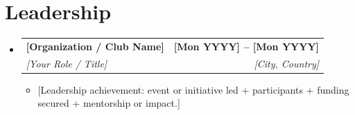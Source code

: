 \documentclass[letterpaper,11pt]{article}
\makeatletter
\newcommand{\resumeItem}[1]{
  \item\small{
    {#1 \vspace{-2pt}}
  }
}
\newcommand{\resumeSubheading}[4]{
  \vspace{-2pt}\item
    \begin{tabular*}{1.0\textwidth}[t]{l@{\extracolsep{\fill}}r}
      \textbf{#1} & \textbf{\small #2} \\
      \textit{\small#3} & \textit{\small #4} \\
    \end{tabular*}\vspace{-7pt}
}
\newcommand{\resumeSubHeadingListStart}{\begin{itemize}[leftmargin=0.0in, label={}]}
\newcommand{\resumeSubHeadingListEnd}{\end{itemize}}
\newcommand{\resumeItemListStart}{\begin{itemize}}
\newcommand{\resumeItemListEnd}{\end{itemize}\vspace{-5pt}}
\makeatother
\begin{document}
\section{Leadership}
    \resumeSubHeadingListStart
        \resumeSubheading{[Organization / Club Name]}{[Mon YYYY] -- [Mon YYYY]}{[Your Role / Title]}{[City, Country]}
            \resumeItemListStart
                \resumeItem{[Leadership achievement: event or initiative led + participants + funding secured + mentorship or impact.]}
            \resumeItemListEnd
    \resumeSubHeadingListEnd
\end{document}
